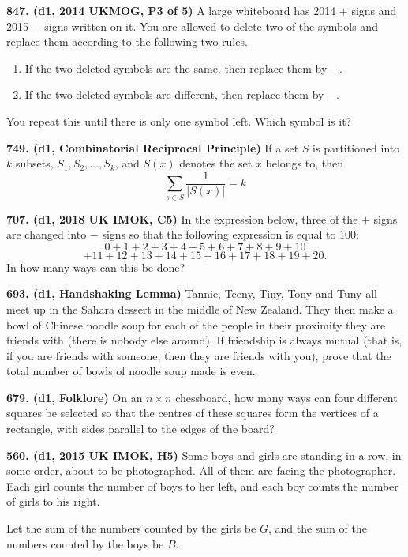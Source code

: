\documentclass{article}
\begin{document}
\textbf{847. (\color{red}d1\color{black}, 2014 UKMOG, P3 of 5)} A large whiteboard has 2014 $+$ signs and 2015 $-$ signs written on it. You are allowed to delete two of the symbols and replace them according to the following two rules.
\begin{enumerate}
        \item If the two deleted symbols are the same, then replace them by $+$.
        \item If the two deleted symbols are different, then replace them by $-$.
\end{enumerate}
You repeat this until there is only one symbol left. Which symbol is it?

\textbf{749. (\color{red}d1\color{black}, Combinatorial Reciprocal Principle)} If a set $S$ is partitioned into $k$ subsets, $S_{1}, S_{2}, \ldots, S_{k}$, and $S(x)$ denotes the set $x$ belongs to, then
$$
        \sum_{s \in S} \frac{1}{|S(x)|}=k
$$

\textbf{707. (\color{red}d1\color{black}, 2018 UK IMOK, C5)} In the expression below, three of the $+$ signs are changed into $-$ signs so that the following expression is equal to $100$:
$$0+1+2+3+4+5+6+7+8+9+10$$
$$+11+12+13+14+15+16+17+18+19+20.$$
In how many ways can this be done?

\textbf{693. (\color{red}d1\color{black}, Handshaking Lemma)} Tannie, Teeny, Tiny, Tony and Tuny all meet up in the Sahara dessert in the middle of New Zealand. They then make a bowl of Chinese noodle soup for each of the people in their proximity they are friends with (there is nobody else around). If friendship is always mutual (that is, if you are friends with someone, then they are friends with you), prove that the total number of bowls of noodle soup made is even.

\textbf{679. (\color{red}d1\color{black}, Folklore)} On an $n\times n$ chessboard, how many ways can four different squares be selected so that the centres of these squares form the vertices of a rectangle, with sides parallel to the edges of the board?

\textbf{560. (\color{red}d1\color{black}, 2015 UK IMOK, H5)} Some boys and girls are standing in a row, in some order, about to be photographed. All of them are facing the photographer. Each girl counts the number of boys to her left, and each boy counts the number of girls to his right.

Let the sum of the numbers counted by the girls be $G$, and the sum of the numbers counted by the boys be $B$.
\end{document}
